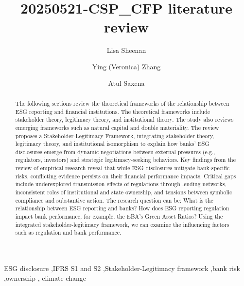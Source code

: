 \documentclass[
  authoryear]{elsarticle}
\begin{document}
\begin{frontmatter}
\title{20250521-CSP\_CFP literature review}

\author[1]{Lisa Sheenan%
%
}
\author[2]{Ying (Veronica) Zhang%
%
}
\author[3]{Atul Saxena%
%
}




        
\begin{abstract}
The following sections review the theoretical frameworks of the
relationship between ESG reporting and financial institutions. The
theoretical frameworks include stakeholder theory, legitimacy theory,
and institutional theory. The study also reviews emerging frameworks
such as natural capital and double materiality. The review proposes a
Stakeholder-Legitimacy Framework, integrating stakeholder theory,
legitimacy theory, and institutional isomorphism to explain how banks'
ESG disclosures emerge from dynamic negotiations between external
pressures (e.g., regulators, investors) and strategic legitimacy-seeking
behaviors. Key findings from the review of empirical research reveal
that while ESG disclosures mitigate bank-specific risks, conflicting
evidence persists on their financial performance impacts. Critical gaps
include underexplored transmission effects of regulations through
lending networks, inconsistent roles of institutional and state
ownership, and tensions between symbolic compliance and substantive
action. The research question can be: What is the relationship between
ESG reporting and banks? How does ESG reporting regulation impact bank
performance, for example, the EBA's Green Asset Ratios? Using the
integrated stakeholder-legitimacy framework, we can examine the
influencing factors such as regulation and bank performance.
\end{abstract}





\begin{keyword}
    ESG disclosure \sep IFRS S1 and S2 \sep Stakeholder-Legitimacy
framework \sep bank risk \sep ownership \sep 
    climate change
\end{keyword}
\end{frontmatter}
    
\end{document}

